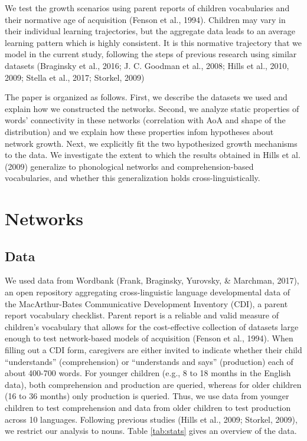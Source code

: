 \documentclass[english,floatsintext,man]{apa6}
\theoremstyle{definition}
\theoremstyle{definition}
\theoremstyle{definition}
\theoremstyle{remark}
\begin{document}
We test the growth scenarios using parent reports of children
vocabularies and their normative age of acquisition (Fenson et al.,
1994). Children may vary in their individual learning trajectories, but
the aggregate data leads to an average learning pattern which is highly
consistent. It is this normative trajectory that we model in the current
study, following the steps of previous research using similar datasets
(Braginsky et al., 2016; J. C. Goodman et al., 2008; Hills et al., 2010,
2009; Stella et al., 2017; Storkel, 2009)

The paper is organized as follows. First, we describe the datasets we
used and explain how we constructed the networks. Second, we analyze
static properties of words' connectivity in these networks (correlation
with AoA and shape of the distribution) and we explain how these
properties infom hypotheses about network growth. Next, we explicitly
fit the two hypothesized growth mechanisms to the data. We investigate
the extent to which the results obtained in Hills et al. (2009)
generalize to phonological networks and comprehension-based
vocabularies, and whether this generalization holds
cross-linguistically.

\section{Networks}\label{networks}

\subsection{Data}\label{data}

We used data from Wordbank (Frank, Braginsky, Yurovsky, \& Marchman,
2017), an open repository aggregating cross-linguistic language
developmental data of the MacArthur-Bates Communicative Development
Inventory (CDI), a parent report vocabulary checklist. Parent report is
a reliable and valid measure of children's vocabulary that allows for
the cost-effective collection of datasets large enough to test
network-based models of acquisition (Fenson et al., 1994). When filling
out a CDI form, caregivers are either invited to indicate whether their
child \enquote{understands} (comprehension) or \enquote{understands and
says} (production) each of about 400-700 words. For younger children
(e.g., 8 to 18 months in the English data), both comprehension and
production are queried, whereas for older children (16 to 36 months)
only production is queried. Thus, we use data from younger children to
test comprehension and data from older children to test production
across 10 languages. Following previous studies (Hills et al., 2009;
Storkel, 2009), we restrict our analysis to nouns. Table \ref{tab:stats}
gives an overview of the data.
\end{document}
